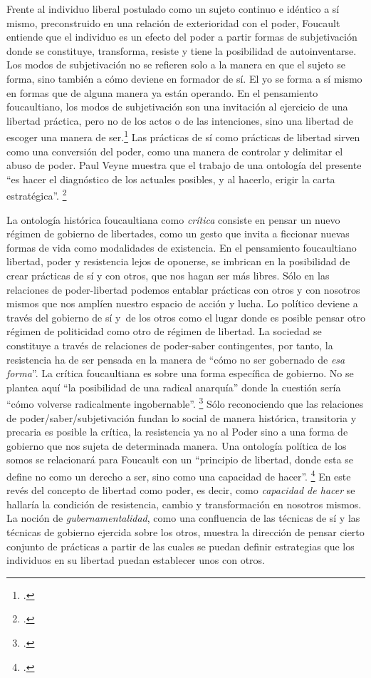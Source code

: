 Frente al individuo liberal postulado como un sujeto continuo e idéntico a sí mismo, preconstruido en una relación de exterioridad con el poder, Foucault entiende que el individuo es un efecto del poder a partir formas de subjetivación donde se constituye, transforma, resiste y tiene la posibilidad de autoinventarse. Los modos de subjetivación no se refieren solo a la manera en que el sujeto se forma, sino también a cómo deviene en formador de sí. El yo se forma a sí mismo en formas que de alguna manera ya están operando. En el pensamiento foucaultiano, los modos de subjetivación son una invitación al ejercicio de una libertad práctica, pero no de los actos o de las intenciones, sino una libertad de escoger una manera de ser.\footcite[][213]{@7057-RAJCHMAN1990} Las prácticas de sí como prácticas de libertad sirven como una conversión del poder, como una manera de controlar y delimitar el abuso de poder. Paul Veyne muestra que el trabajo de una ontología del presente \enquote{es hacer el diagnóstico de los actuales posibles, y al hacerlo, erigir la carta estratégica}. \footcite[][7]{@7060-VEYNE1987}

La ontología histórica foucaultiana como \emph{crítica} consiste en pensar un nuevo régimen de gobierno de libertades, como un gesto que invita a ficcionar nuevas formas de vida como modalidades de existencia. En el pensamiento foucaultiano libertad, poder y resistencia lejos de oponerse, se imbrican en la posibilidad de crear prácticas de sí y con otros, que nos hagan ser más libres. Sólo en las relaciones de poder-libertad podemos entablar prácticas con otros y con nosotros mismos que nos amplíen nuestro espacio de acción y lucha. Lo político deviene a través del gobierno de sí y~de los otros como el lugar donde es posible pensar otro régimen de politicidad como otro de régimen de libertad. La sociedad se constituye a través de relaciones de poder-saber contingentes, por tanto, la resistencia ha de ser pensada en la manera de \enquote{cómo no ser gobernado de \emph{esa forma}}. La crítica foucaultiana es sobre una forma específica de gobierno. No se plantea aquí \enquote{la posibilidad de una radical anarquía} donde la cuestión sería \enquote{cómo volverse radicalmente ingobernable}. \footcite[][6]{@7036-BUTLER2001} Sólo reconociendo que las relaciones de poder/saber/subjetivación fundan lo social de manera histórica, transitoria y precaria es posible la crítica, la resistencia ya no al Poder sino a una forma de gobierno que nos sujeta de determinada manera. Una ontología política de los somos se relacionará para Foucault con un \enquote{principio de libertad, donde esta se define no como un derecho a ser, sino como una capacidad de hacer}. \footcite[][316]{@7068-FOUCAULT2010} En este revés del concepto de libertad como poder, es decir, como \emph{capacidad de hacer} se hallaría la condición de resistencia, cambio y transformación en nosotros mismos. La noción de \emph{gubernamentalidad}, como una confluencia de las técnicas de sí y las técnicas de gobierno ejercida sobre los otros, muestra la dirección de pensar cierto conjunto de prácticas a partir de las cuales se puedan definir estrategias que los individuos en su libertad puedan establecer unos con otros.

